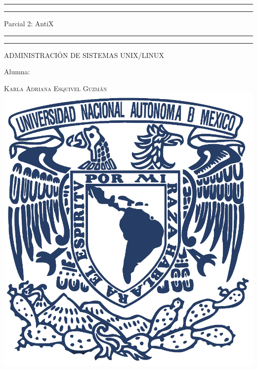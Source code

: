 \documentclass[a4paper, 11pt, oneside]{article}
\begin{document}
 

\begin{titlepage} 

	\centering 
	
	\scshape 
	
	\vspace*{\baselineskip} 
	
	
	
	\rule{\textwidth}{1.6pt}\vspace*{-\baselineskip}\vspace*{2pt} 
	\rule{\textwidth}{0.4pt} 
	
	\vspace{0.75\baselineskip} 
	
	{\LARGE Parcial 2: AntiX}	
	\vspace{0.75\baselineskip} 
	
	\rule{\textwidth}{0.4pt}\vspace*{-\baselineskip}\vspace{3.2pt}
	\rule{\textwidth}{1.6pt} 
	
	\vspace{2\baselineskip} 
	

	ADMINISTRACIÓN DE SISTEMAS UNIX/LINUX
	
	\vspace*{1\baselineskip} 
	
	
	
	Alumna:
	
	\vspace{0.2\baselineskip} 
	
	{\scshape\Large Karla Adriana Esquivel Guzmán}  
	\vspace{0.5\baselineskip} 
	\vfill
	\includegraphics{unam.jpg}
	

\end{titlepage}
\end{document}

